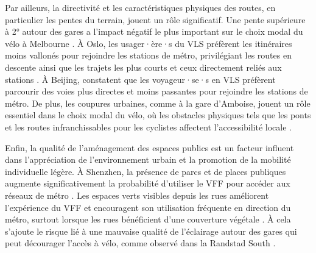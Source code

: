 \begin{refsegment}
Par ailleurs, la directivité et les caractéristiques physiques des routes, en particulier les pentes du terrain, jouent un rôle significatif. Une pente supérieure à 2° autour des gares a l'impact négatif le plus important sur le choix modal du vélo à Melbourne \textcolor{blue}{\autocite[403]{weliwitiya_bicycle_2019}}. À Oslo, les usager·ère·s du \acrshort{VLS} préfèrent les itinéraires moins vallonés pour rejoindre les stations de métro, privilégiant les routes en descente ainsi que les trajets les plus courts et ceux directement reliés aux stations \textcolor{blue}{\autocite[394]{bocker_bike_2020}}. À Beijing, \textcolor{blue}{\textcite[10]{zhao_public_2022}} constatent que les voyageur·se·s en \acrshort{VLS} préfèrent parcourir des voies plus directes et moins passantes pour rejoindre les stations de métro. De plus, les coupures urbaines, comme à la gare d'Amboise, jouent un rôle essentiel dans le choix modal du vélo, où les obstacles physiques tels que les ponts et les routes infranchissables pour les cyclistes affectent l'accessibilité locale \textcolor{blue}{\autocite[88]{papon_rapport_2015}}.%

Enfin, la qualité de l'aménagement des espaces publics est un facteur influent dans l'appréciation de l'environnement urbain et la promotion de la mobilité individuelle légère. À Shenzhen, la présence de parcs et de places publiques augmente significativement la probabilité d'utiliser le \acrshort{VFF} pour accéder aux réseaux de métro \textcolor{blue}{\autocite[25]{guo_dockless_2021}}. Les espaces verts visibles depuis les rues améliorent l'expérience du \acrshort{VFF} et encouragent son utilisation fréquente en direction du métro, surtout lorsque les rues bénéficient d'une couverture végétale \textcolor{blue}{\autocite[5]{wang_relationship_2020}}. À cela s'ajoute le risque lié à une mauvaise qualité de l'éclairage autour des gares qui peut décourager l'accès à vélo, comme observé dans la Randstad South \textcolor{blue}{\autocite[45-46]{la_paix_puello_modelling_2015}}.%


\end{refsegment}

